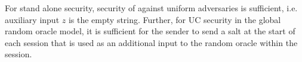 \begin{remark}
For stand alone security, security of \UKA against uniform adversaries is sufficient, i.e. auxiliary input $z$ is the empty string. Further, for UC security in the global random oracle model, it is sufficient for the sender to send a salt at the start of each session that is used as an additional input to the random oracle within the session. 
\end{remark}
